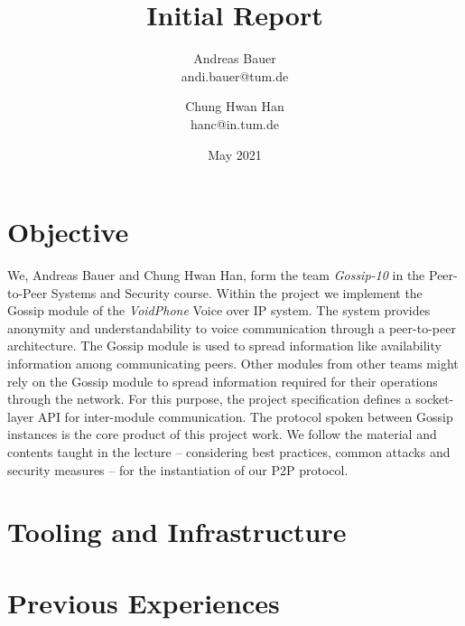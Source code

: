 \documentclass[a4paper, 11pt]{article}
\title{Initial Report}
\author{
    Andreas Bauer\\
    andi.bauer@tum.de
  \and
    Chung Hwan Han\\
    hanc@in.tum.de
}
\date{May 2021}
\begin{document}
    \maketitle

    \section{Objective}\label{sec:objective}

    We, Andreas Bauer and Chung Hwan Han, form the team \textit{Gossip-10} in the Peer-to-Peer Systems and Security course.
    Within the project we implement the Gossip module of the \textit{VoidPhone} Voice over IP system.
    The system provides anonymity and understandability to voice communication through a peer-to-peer architecture.
    The Gossip module is used to spread information like availability information among communicating peers.
    Other modules from other teams might rely on the Gossip module to spread information required for their operations
    through the network.
    For this purpose, the project specification defines a socket-layer API for inter-module communication.
    The protocol spoken between Gossip instances is the core product of this project work.
    We follow the material and contents taught in the lecture -- considering best practices, common attacks and security measures --
    for the instantiation of our P2P protocol.

    \section{Tooling and Infrastructure}\label{sec:tooling-and-infrastructure} %


    \section{Previous Experiences}\label{sec:previous-experiences}


\end{document}

